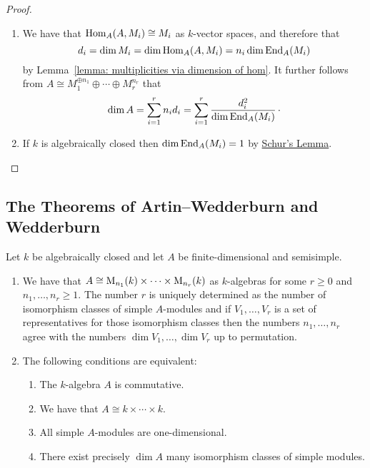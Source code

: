 \begin{proof}
  \leavevmode
  \begin{enumerate}
    \item
      We have that $\operatorname{Hom}_A(A, M_i) \cong M_i$ as $k$-vector spaces, and therefore that
      \[
          d_i
        = \dim M_i
        = \dim \operatorname{Hom}_A(A, M_i)
        = n_i \dim \operatorname{End}_A(M_i)
      \]
      by Lemma~\ref{lemma: multiplicities via dimension of hom}.
      It further follows from $A \cong M_1^{\oplus n_1} \oplus \dotsb \oplus M_r^{n_r}$ that
      \[
          \dim A
        = \sum_{i=1}^r n_i d_i
        = \sum_{i=1}^r \frac{d_i^2}{\dim \operatorname{End}_A(M_i)} \,\cdotp
      \]
    \item
      If $k$ is algebraically closed then $\dim \operatorname{End}_A(M_i) = 1$ by \hyperref[proposition: schurs lemma for modules]{Schur’s Lemma}.
    \qedhere
  \end{enumerate}
\end{proof}





\subsection*{The Theorems of Artin--Wedderburn and Wedderburn}


\begin{corollary}
  \label{corollary: semisimple algebra product of matrix algebras}
  Let $k$ be algebraically closed and let $A$ be finite-dimensional and semisimple.
  \begin{enumerate}
    \item
      \label{enumerate: ss algebra is product of matrix rings}
      We have that $A \cong \operatorname{M}_{n_1}(k) \times \dotsm \times \operatorname{M}_{n_r}(k)$ as $k$-algebras for some $r \geq 0$ and $n_1, \dotsc, n_r \geq 1$.
      The number $r$ is uniquely determined as the number of isomorphism classes of simple $A$-modules and if $V_1, \dotsc, V_r$ is a set of representatives for those isomorphism classes then the numbers $n_1, \dotsc, n_r$ agree with the numbers $\dim V_1, \dotsc, \dim V_r$ up to permutation.
    \item
      The following conditions are equivalent:
      \begin{enumerate}
        \item
          The $k$-algebra $A$ is commutative.
        \item
          We have that $A \cong k \times \dotsb \times k$.
        \item
          All simple $A$-modules are one-dimensional.
        \item
          There exist precisely $\dim A$ many isomorphism classes of simple modules.
      \end{enumerate}
  \end{enumerate}
\end{corollary}


